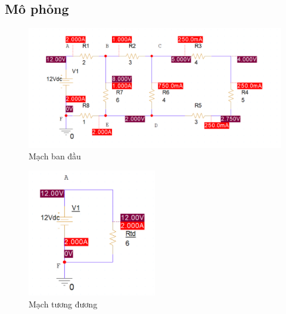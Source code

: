 \subsection{Mô phỏng}
\begin{figure}[!htbp]
    \centering
    \includegraphics[width=1\textwidth]{graphics/ex2/f2.png}
    \caption{Mạch ban đầu}
    \end{figure}
    \begin{figure}[!htbp]
        \centering
        \includegraphics[width=0.5\textwidth]{graphics/ex2/f6.png}
        \caption{Mạch tương đương}
        \end{figure}

